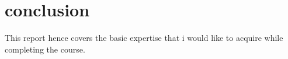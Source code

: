 \documentclass[11pt]{article}
\begin{document}
\vspace{3cm}

\section{conclusion}

\hspace{1in}This report hence covers the basic expertise that i would like to acquire while \\ completing the course.
\end{document}
